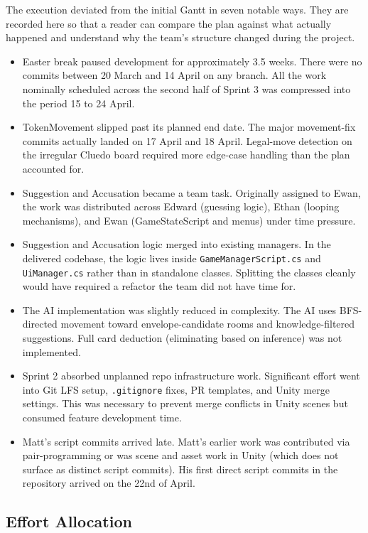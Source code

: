 The execution deviated from the initial Gantt in seven notable ways. They are recorded here so that a reader can compare the plan against what actually happened and understand why the team's structure changed during the project.

\begin{itemize}
    \item Easter break paused development for approximately 3.5 weeks. There were no commits between 20 March and 14 April on any branch. All the work nominally scheduled across the second half of Sprint 3 was compressed into the period 15 to 24 April.
    \item TokenMovement slipped past its planned end date. The major movement-fix commits actually landed on 17 April and 18 April. Legal-move detection on the irregular Cluedo board required more edge-case handling than the plan accounted for.
    \item Suggestion and Accusation became a team task. Originally assigned to Ewan, the work was distributed across Edward (guessing logic), Ethan (looping mechanisms), and Ewan (GameStateScript and menus) under time pressure.
    \item Suggestion and Accusation logic merged into existing managers. In the delivered codebase, the logic lives inside \texttt{GameManagerScript.cs} and \texttt{UiManager.cs} rather than in standalone classes. Splitting the classes cleanly would have required a refactor the team did not have time for.
    \item The AI implementation was slightly reduced in complexity. The AI uses BFS-directed movement toward envelope-candidate rooms and knowledge-filtered suggestions. Full card deduction (eliminating based on inference) was not implemented.
    \item Sprint 2 absorbed unplanned repo infrastructure work. Significant effort went into Git LFS setup, \texttt{.gitignore} fixes, PR templates, and Unity merge settings. This was necessary to prevent merge conflicts in Unity scenes but consumed feature development time.
    \item Matt's script commits arrived late. Matt's earlier work was contributed via pair-programming or was scene and asset work in Unity (which does not surface as distinct script commits). His first direct script commits in the repository arrived on the 22nd of April.
\end{itemize}

\subsection{Effort Allocation}

